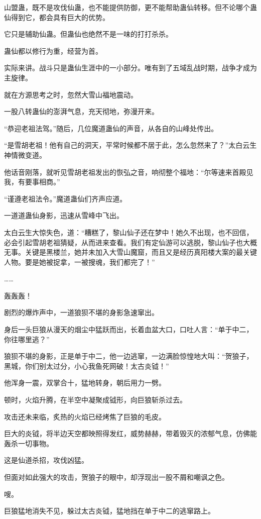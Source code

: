 \begin{this_body}
山盟蛊，既不是攻伐仙蛊，也不能提供防御，更不能帮助蛊仙转移。但不论哪个蛊仙得到它，都会具有巨大的优势。

它只是辅助仙蛊。但蛊仙也绝然不是一味的打打杀杀。

蛊仙都以修行为重，经营为首。

实际来讲。战斗只是蛊仙生涯中的一小部分。唯有到了五域乱战时期，战争才成为主旋律。

就在方源思考之时，忽然大雪山福地震动。

一股八转蛊仙的澎湃气息，充天彻地，弥漫开来。

“恭迎老祖法驾。”随后，几位魔道蛊仙的声音，从各自的山峰处传出。

“是雪胡老祖！他有自己的洞天，平常时候都不居于此，怎么忽然来了？”太白云生神情微变道。

他话音刚落，就听见雪胡老祖发出的恢弘之音，响彻整个福地：“尔等速来首殿见我，有要事相商。”

“谨遵老祖法令。”魔道蛊仙们齐声应道。

一道道蛊仙身影，迅速从雪峰中飞出。

太白云生大惊失色，道：“糟糕了，黎山仙子还在梦中！她久不出现，也不回信，必会引起雪胡老祖猜疑，从而进来查看。我们有定仙游可以逃脱，黎山仙子也大概无事。关键是黑楼兰，她并未加入大雪山魔窟，而且又是经历真阳楼大案的最关键人物。要是她被捉拿，一被搜魂，我们都完了！”

……

轰轰轰！

剧烈的爆炸声中，一道狼狈不堪的身影急速窜出。

身后一头巨狼从漫天的烟尘中猛跃而出，长着血盆大口，口吐人言：“单于中二，你往哪里逃？”

狼狈不堪的身影，正是单于中二，他一边逃窜，一边满脸惊惶地大叫：“贺狼子，黑城，你们别太过分，小心我鱼死网破！太古炎钺！”

他浑身一震，双掌合十，猛地转身，朝后用力一劈。

顿时，火焰升腾，在半空中凝聚成钺形，向巨狼斩杀过去。

攻击还未来临，炙热的火焰已经烤焦了巨狼的毛皮。

巨大的炎钺，将半边天空都映照得发红，威势赫赫，带着毁灭的浓郁气息，仿佛能轰杀一切事物。

这是仙道杀招，攻伐凶猛。

但面对如此强大的攻击，贺狼子的眼中，却浮现出一股不屑和嘲讽之色。

嗖。

巨狼猛地消失不见，躲过太古炎钺，猛地挡在单于中二的逃窜路上。


\end{this_body}
